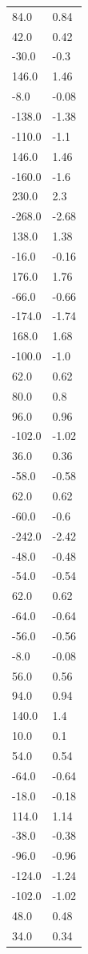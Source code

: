 \begin{longtable}{ll}
84.0 & 0.84 \\
42.0 & 0.42 \\
-30.0 & -0.3 \\
146.0 & 1.46 \\
-8.0 & -0.08 \\
-138.0 & -1.38 \\
-110.0 & -1.1 \\
146.0 & 1.46 \\
-160.0 & -1.6 \\
230.0 & 2.3 \\
-268.0 & -2.68 \\
138.0 & 1.38 \\
-16.0 & -0.16 \\
176.0 & 1.76 \\
-66.0 & -0.66 \\
-174.0 & -1.74 \\
168.0 & 1.68 \\
-100.0 & -1.0 \\
62.0 & 0.62 \\
80.0 & 0.8 \\
96.0 & 0.96 \\
-102.0 & -1.02 \\
36.0 & 0.36 \\
-58.0 & -0.58 \\
62.0 & 0.62 \\
-60.0 & -0.6 \\
-242.0 & -2.42 \\
-48.0 & -0.48 \\
-54.0 & -0.54 \\
62.0 & 0.62 \\
-64.0 & -0.64 \\
-56.0 & -0.56 \\
-8.0 & -0.08 \\
56.0 & 0.56 \\
94.0 & 0.94 \\
140.0 & 1.4 \\
10.0 & 0.1 \\
54.0 & 0.54 \\
-64.0 & -0.64 \\
-18.0 & -0.18 \\
114.0 & 1.14 \\
-38.0 & -0.38 \\
-96.0 & -0.96 \\
-124.0 & -1.24 \\
-102.0 & -1.02 \\
48.0 & 0.48 \\
34.0 & 0.34 \\

\end{longtable}
